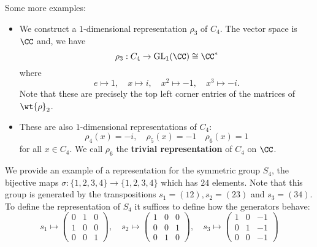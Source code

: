 \documentclass[12pt, a4paper]{article}
\newcommand{\gl}{\text{GL}}
\begin{document}
\begin{example}
    Some more examples:
    \begin{itemize}
        \item We construct a \(1\)-dimensional representation \(\rho_3\) of \(C_4\). The vector space is \(\CC\) and, we have 
        \[\rho_3 :C_4 \to \gl_1(\CC) \cong \CC^{*}\]
        where 
        \[e\mapsto 1, \quad x \mapsto i, \quad x^2 \mapsto -1, \quad x^3 \mapsto -i.\]
        Note that these are precisely the top left corner entries of the matrices of \(\wt{\rho}_2\).
        \item These are also \(1\)-dimensional representations of \(C_4\):
        \[\rho_4(x) = -i, \quad \rho_5(x)=-1\quad \rho_6(x)=1\]
        for all \(x \in C_4\). We call \(\rho_6\) the \textbf{trivial representation} of \(C_4\) on \(\CC\).
    \end{itemize}
\end{example}

\begin{mdexample}
    We provide an example of a representation for the symmetric group \(S_4\), the bijective maps \(\sigma:\{1,2,3,4\} \to \{1,2,3,4\}\) which has \(24\) elements. Note that this group is generated by the transpositions \(s_1 = (12),s_2 = (23)\) and \(s_3=(34)\). To define the representation of \(S_4\) it suffices to define how the generators behave:
    \[s_1 \mapsto \begin{pmatrix} 0 & 1 &0 \\ 1 & 0 & 0 \\ 0 & 0 & 1 \end{pmatrix},\quad s_2 \mapsto \begin{pmatrix} 1 & 0 & 0 \\ 0 & 0 & 1 \\ 0 & 1 & 0 \end{pmatrix},\quad s_3 \mapsto \begin{pmatrix} 1 & 0 & -1 \\ 0 & 1 & -1 \\ 0 & 0 & -1\end{pmatrix}\]
\end{mdexample}
\end{document}
